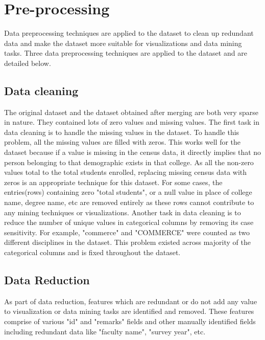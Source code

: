 \section{Pre-processing}
Data preprocessing techniques are applied to the dataset to clean up redundant data and make the dataset more suitable for visualizations and data mining tasks. Three data preprocessing techniques are applied to the dataset and are detailed below. 

\subsection{Data cleaning}
The original dataset and the dataset obtained after merging are both very sparse in nature. They contained lots of zero values and missing values. The first task in data cleaning is to handle the missing values in the dataset. To handle this problem, all the missing values are filled with zeros. This works well for the dataset because if a value is missing in the census data, it directly implies that no person belonging to that demographic exists in that college. As all the non-zero values total to the total students enrolled, replacing missing census data with zeros is an appropriate technique for this dataset. For some cases, the entries(rows) containing zero "total students", or a null value in place of college name, degree name, etc are removed entirely as these rows cannot contribute to any mining techniques or visualizations.
Another task in data cleaning is to reduce the number of unique values in categorical columns by removing its case sensitivity. For example, "commerce" and "COMMERCE" were counted as two different disciplines in the dataset. This problem existed across majority of the categorical columns and is fixed throughout the dataset.

\subsection{Data Reduction}
As part of data reduction, features which are redundant or do not add any value to visualization or data mining tasks are identified and removed. These features comprise of various "id" and "remarks" fields and other manually identified fields including redundant data like "faculty name", "survey year", etc. 

